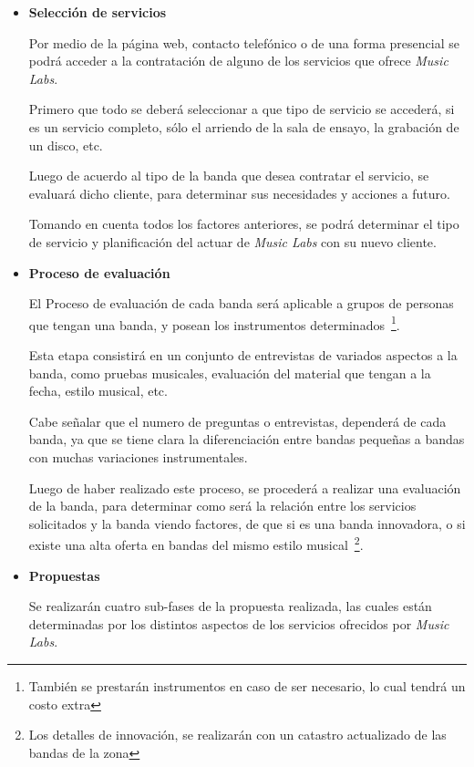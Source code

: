 \begin{itemize}
	\item \textbf{Selección de servicios}

		Por medio de la página web, contacto telefónico o de
		una forma presencial se podrá acceder a la contratación
		de alguno de los servicios que ofrece \emph{Music Labs}.

		Primero que todo se deberá seleccionar a que tipo de servicio
		se accederá, si es un servicio completo, sólo el arriendo
		de la sala de ensayo, la grabación de un disco, etc.

		Luego de acuerdo al tipo de la banda que desea contratar
		el servicio, se evaluará dicho cliente, para determinar
		sus necesidades y acciones a futuro.

		Tomando en cuenta todos los factores anteriores, se podrá
		determinar el tipo de servicio y planificación del actuar
		de \emph{Music Labs} con su nuevo cliente.
	\item \textbf{Proceso de evaluación}

		El Proceso de evaluación de cada banda será aplicable a grupos
		de personas que tengan una banda, y posean los instrumentos
		determinados~\footnote{También se prestarán instrumentos en caso de ser necesario, lo cual tendrá un costo extra}.

		Esta etapa consistirá en un conjunto de entrevistas de variados
		aspectos a la banda, como pruebas musicales, evaluación
		del material que tengan a la fecha, estilo musical, etc.

		Cabe señalar que el numero de preguntas o entrevistas, dependerá
		de cada banda, ya que se tiene clara la diferenciación entre
		bandas pequeñas a bandas con muchas variaciones instrumentales.

		Luego de haber realizado este proceso, se procederá
		a realizar una evaluación de la banda, para determinar
		como será la relación entre los servicios solicitados y la banda
		viendo factores, de que si es una banda innovadora,
		o si existe una alta oferta en bandas del mismo estilo musical~\footnote{Los detalles
		de innovación, se realizarán con un catastro actualizado de las bandas de la zona}.
				
	\item \textbf{Propuestas}

		Se realizarán cuatro sub-fases de la propuesta realizada, las cuales
		están determinadas por los distintos aspectos de los servicios
		ofrecidos por \emph{Music Labs}.


\end{itemize}
